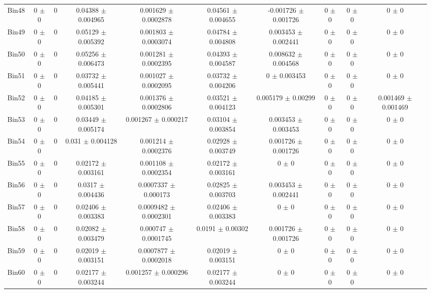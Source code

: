 \begin{tabular}{@{\extracolsep{4pt}}lccccccccc@{}}
     Bin48 & 0 $\pm$ 0 & 0 & 0.04388 $\pm$ 0.004965 & 0.001629 $\pm$ 0.0002878 & 0.04561 $\pm$ 0.004655 & -0.001726 $\pm$ 0.001726 & 0 $\pm$ 0 & 0 $\pm$ 0 & 0 $\pm$ 0 \\ 
     Bin49 & 0 $\pm$ 0 & 0 & 0.05129 $\pm$ 0.005392 & 0.001803 $\pm$ 0.0003074 & 0.04784 $\pm$ 0.004808 & 0.003453 $\pm$ 0.002441 & 0 $\pm$ 0 & 0 $\pm$ 0 & 0 $\pm$ 0 \\ 
     Bin50 & 0 $\pm$ 0 & 0 & 0.05256 $\pm$ 0.006473 & 0.001281 $\pm$ 0.0002395 & 0.04393 $\pm$ 0.004587 & 0.008632 $\pm$ 0.004568 & 0 $\pm$ 0 & 0 $\pm$ 0 & 0 $\pm$ 0 \\ 
     Bin51 & 0 $\pm$ 0 & 0 & 0.03732 $\pm$ 0.005441 & 0.001027 $\pm$ 0.0002095 & 0.03732 $\pm$ 0.004206 & 0 $\pm$ 0.003453 & 0 $\pm$ 0 & 0 $\pm$ 0 & 0 $\pm$ 0 \\ 
     Bin52 & 0 $\pm$ 0 & 0 & 0.04185 $\pm$ 0.005301 & 0.001376 $\pm$ 0.0002806 & 0.03521 $\pm$ 0.004123 & 0.005179 $\pm$ 0.00299 & 0 $\pm$ 0 & 0 $\pm$ 0 & 0.001469 $\pm$ 0.001469 \\ 
     Bin53 & 0 $\pm$ 0 & 0 & 0.03449 $\pm$ 0.005174 & 0.001267 $\pm$ 0.000217 & 0.03104 $\pm$ 0.003854 & 0.003453 $\pm$ 0.003453 & 0 $\pm$ 0 & 0 $\pm$ 0 & 0 $\pm$ 0 \\ 
     Bin54 & 0 $\pm$ 0 & 0 & 0.031 $\pm$ 0.004128 & 0.001214 $\pm$ 0.0002376 & 0.02928 $\pm$ 0.003749 & 0.001726 $\pm$ 0.001726 & 0 $\pm$ 0 & 0 $\pm$ 0 & 0 $\pm$ 0 \\ 
     Bin55 & 0 $\pm$ 0 & 0 & 0.02172 $\pm$ 0.003161 & 0.001108 $\pm$ 0.0002354 & 0.02172 $\pm$ 0.003161 & 0 $\pm$ 0 & 0 $\pm$ 0 & 0 $\pm$ 0 & 0 $\pm$ 0 \\ 
     Bin56 & 0 $\pm$ 0 & 0 & 0.0317 $\pm$ 0.004436 & 0.0007337 $\pm$ 0.000173 & 0.02825 $\pm$ 0.003703 & 0.003453 $\pm$ 0.002441 & 0 $\pm$ 0 & 0 $\pm$ 0 & 0 $\pm$ 0 \\ 
     Bin57 & 0 $\pm$ 0 & 0 & 0.02406 $\pm$ 0.003383 & 0.0009482 $\pm$ 0.0002301 & 0.02406 $\pm$ 0.003383 & 0 $\pm$ 0 & 0 $\pm$ 0 & 0 $\pm$ 0 & 0 $\pm$ 0 \\ 
     Bin58 & 0 $\pm$ 0 & 0 & 0.02082 $\pm$ 0.003479 & 0.000747 $\pm$ 0.0001745 & 0.0191 $\pm$ 0.00302 & 0.001726 $\pm$ 0.001726 & 0 $\pm$ 0 & 0 $\pm$ 0 & 0 $\pm$ 0 \\ 
     Bin59 & 0 $\pm$ 0 & 0 & 0.02019 $\pm$ 0.003151 & 0.0007877 $\pm$ 0.0002018 & 0.02019 $\pm$ 0.003151 & 0 $\pm$ 0 & 0 $\pm$ 0 & 0 $\pm$ 0 & 0 $\pm$ 0 \\ 
     Bin60 & 0 $\pm$ 0 & 0 & 0.02177 $\pm$ 0.003244 & 0.001257 $\pm$ 0.000296 & 0.02177 $\pm$ 0.003244 & 0 $\pm$ 0 & 0 $\pm$ 0 & 0 $\pm$ 0 & 0 $\pm$ 0 \\ 
\hline\hline
  \end{tabular}
